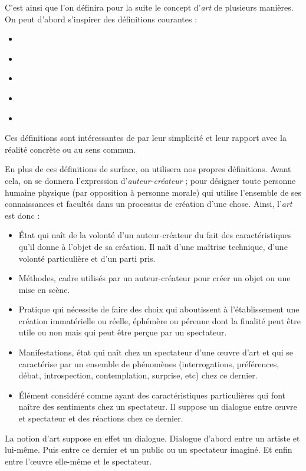 \documentclass[12pt]{article} %
\begin{document}
C'est ainsi que l'on définira pour la suite le concept d'\textit{art} de plusieurs manières. On peut d'abord s'inspirer des définitions courantes :
\begin{itemize}
    \item {} \cite{WiktionnaireFr-art}
    \item {} \cite{WiktionnaireFr-art}
    \item {} \cite{LarousseOnline-art}
    \item {} \cite{LarousseOnline-art}
    \item {} \cite{LarousseOnline-art}
\end{itemize}
Ces définitions sont intéressantes de par leur simplicité et leur rapport avec la réalité concrète ou au sens commun.

En plus de ces définitions de surface, on utilisera nos propres définitions. Avant cela, on se donnera l'expression d'\textit{auteur-créateur} ; pour désigner toute personne humaine physique (par opposition à personne morale) qui utilise l'ensemble de ses connaissances et facultés dans un processus de création d'une chose. Ainsi, l'\textit{art} est donc :
\begin{itemize}
    \item État qui naît de la volonté d'un auteur-créateur du fait des caractéristiques qu'il donne à l'objet de sa création. Il naît d'une maîtrise technique, d'une volonté particulière et d'un parti pris.
    \item Méthodes, cadre utilisés par un auteur-créateur pour créer un objet ou une mise en scène.\label{art_definition_cadre}
    \item Pratique qui nécessite de faire des choix qui aboutissent à l'établissement une création immatérielle ou réelle, éphémère ou pérenne dont la finalité peut être utile ou non mais qui peut être perçue par un spectateur.
    \item Manifestations, état qui naît chez un spectateur d'une œuvre d'art et qui se caractérise par un ensemble de phénomènes (interrogations, préférences, débat, introspection, contemplation, surprise, etc) chez ce dernier.
    \item Élément considéré comme ayant des caractéristiques particulières qui font naître des sentiments chez un spectateur. Il suppose un dialogue entre œuvre et spectateur et des réactions chez ce dernier.
\end{itemize}
La notion d'art suppose en effet un dialogue. Dialogue d'abord entre un artiste et lui-même. Puis entre ce dernier et un public ou un spectateur imaginé. Et enfin entre l'œuvre elle-même et le spectateur. 
\end{document}
